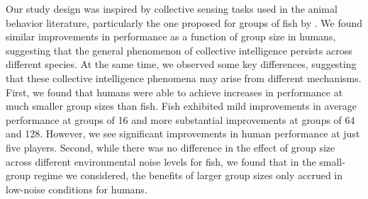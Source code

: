 \documentclass[12pt,letterpaper]{article}
\begin{document}
Our study design was inspired by collective sensing tasks used in the animal behavior literature, particularly the one proposed for groups of fish by . 
We found similar improvements in performance as a function of group size in humans, suggesting that the general phenomenon of collective intelligence persists across different species.
At the same time, we observed some key differences, suggesting that these collective intelligence phenomena may arise from different mechanisms.
First, we found that humans were able to achieve increases in performance at much smaller group sizes than fish. 
Fish exhibited mild improvements in average performance at groups of 16 and more substantial improvements at groups of 64 and 128.  
However, we see significant improvements in human performance at just five players. 
Second, while there was no difference in the effect of group size across different environmental noise levels for fish, we found that in the small-group regime we considered, the benefits of larger group sizes only accrued in low-noise conditions for humans.


\end{document}
